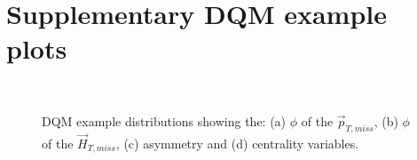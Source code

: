 \section{Supplementary DQM example plots}
\begin{figure}[htbp]
  \centering
    \\
  \caption{DQM example distributions showing the: (a) $\phi$ of the $\vec{p}_{T,miss}$, (b) $\phi$ of the $\vec{H}_{T,miss}$, (c) asymmetry and (d) centrality variables.}
  \label{app:dqm_plots}
\end{figure}
\newpage


